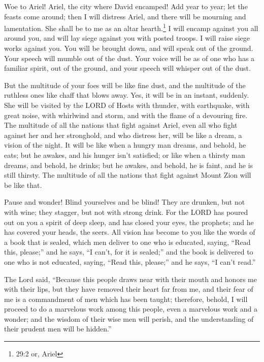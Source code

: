 \mychapter{} \myverse*{}Woe to Ariel! Ariel, the city where David encamped! Add year to
year; let the feasts come around;
\myverse{}then I will distress Ariel, and there will be mourning and lamentation. She
shall be to me as an altar hearth.\footnote{29:2 or, Ariel}
\myverse{}I will encamp against you all around you, and will lay siege against you with
posted troops. I will raise siege works against you.
\myverse{}You will be brought down, and will speak out of the ground. Your speech will
mumble out of the dust. Your voice will be as of one who has a familiar spirit, out of the ground, and
your speech will whisper out of the dust.

\myverse{}But the multitude of your foes will be like fine dust, and the
multitude of the ruthless ones like chaff that blows away. Yes, it will be in an instant, suddenly.
\myverse{}She will be visited by the LORD of Hosts with thunder, with earthquake, with
great noise, with whirlwind and storm, and with the flame of a devouring fire.
\myverse{}The multitude of all the nations that fight against Ariel, even all who fight
against her and her stronghold, and who distress her, will be like a dream, a vision of the night.
\myverse{}It will be like when a hungry man dreams, and behold, he eats; but he awakes,
and his hunger isn’t satisfied; or like when a thirsty man dreams, and behold, he drinks; but he awakes,
and behold, he is faint, and he is still thirsty. The multitude of all the nations that fight against
Mount Zion will be like that.

\myverse{}Pause and wonder! Blind yourselves and be blind! They are drunken,
but not with wine; they stagger, but not with strong drink.
\myverse{}For the LORD has poured out on you a spirit of deep sleep, and has closed
your eyes, the prophets; and he has covered your heads, the seers.
\myverse{}All vision has become to you like the words of a book that is sealed, which
men deliver to one who is educated, saying, “Read this, please;” and he says, “I can’t, for it is sealed;”
\myverse{}and the book is delivered to one who is not educated, saying, “Read this,
please;” and he says, “I can’t read.”

\myverse{}The Lord said, “Because this people draws near with their mouth
and honors me with their lips, but they have removed their heart far from me, and their fear of me is
a commandment of men which has been taught;
\myverse{}therefore, behold, I will proceed to do a marvelous work among this people,
even a marvelous work and a wonder; and the wisdom of their wise men will perish, and the understanding
of their prudent men will be hidden.”

